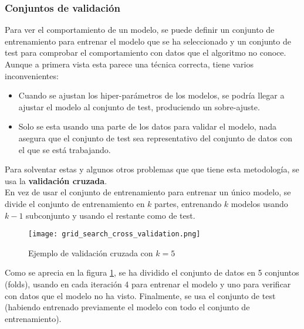 \subsubsection{Conjuntos de validación}
Para ver el comportamiento de un modelo, se puede definir un conjunto de entrenamiento para entrenar el modelo que se ha seleccionado y un conjunto de test para comprobar el comportamiento con datos que el algoritmo no conoce.  Aunque a primera vista esta parece una técnica correcta, tiene varios inconvenientes:
\begin{itemize}
	\item Cuando se ajustan los hiper-parámetros de los modelos,  se podría llegar a ajustar el modelo al conjunto de test, produciendo un sobre-ajuste.
	\item Solo se esta usando una parte de los datos para validar el modelo, nada asegura que el conjunto de test sea representativo del conjunto de datos con el que se está trabajando.
\end{itemize}
Para solventar estas y algunos otros problemas que que tiene esta metodología, se usa la \textbf{validación cruzada}.\\
\linebreak
En vez de usar el conjunto de entrenamiento para entrenar un único modelo, se divide el conjunto de entrenamiento en $k$ partes, entrenando $k$ modelos usando $k-1$ subconjunto y usando el restante como de test. \\
 \begin{figure}[!htbp]
	\centering
	\texttt{[image: grid\_search\_cross\_validation.png]}
	\caption{Ejemplo de validación cruzada con $k=5$}
	\label{fig:cross-validation}
\end{figure}
\linebreak
Como se aprecia en la figura \ref{fig:cross-validation},  se ha dividido el conjunto de datos en 5 conjuntos (folds), usando en cada iteración 4 para entrenar el modelo y uno para verificar con datos que el modelo no ha visto. Finalmente, se usa el conjunto de test (habiendo entrenado previamente el modelo con todo el conjunto de entrenamiento).
